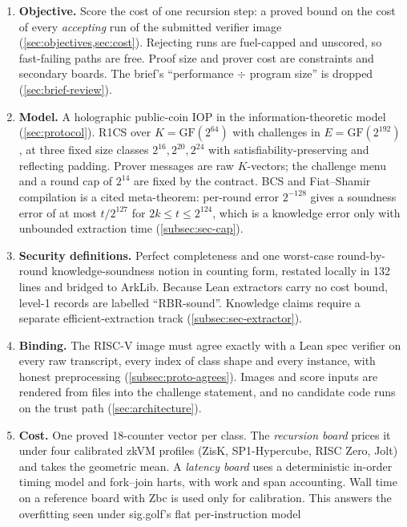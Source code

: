 \begin{takeaway}
\begin{enumerate}[nosep,leftmargin=*]
\item \textbf{Objective.} Score the cost of one recursion step: a proved bound on the cost of every
  \emph{accepting} run of the submitted verifier image (\cref{sec:objectives,sec:cost}). Rejecting
  runs are fuel-capped and unscored, so fast-failing paths are free. Proof size and prover cost are
  constraints and secondary boards. The brief's \enquote{performance $\div$ program size} is dropped
  (\cref{sec:brief-review}).
\item \textbf{Model.} A holographic public-coin IOP in the information-theoretic model
  (\cref{sec:protocol}). R1CS over $K=\mathrm{GF}(2^{64})$ with challenges in
  $E=\mathrm{GF}(2^{192})$, at three fixed size classes $2^{16},2^{20},2^{24}$ with
  satisfiability-preserving and reflecting padding. Prover messages are raw $K$-vectors; the
  challenge menu and a round cap of $2^{14}$ are fixed by the contract. BCS and Fiat--Shamir
  compilation is a cited meta-theorem: per-round error $2^{-128}$ gives a soundness error of at most
  $t/2^{127}$ for $2k\le t\le2^{124}$, which is a knowledge error only with unbounded extraction time
  (\cref{subsec:sec-cap}).
\item \textbf{Security definitions.} Perfect completeness and one worst-case round-by-round
  knowledge-soundness notion in counting form, restated locally in 132 lines and bridged to
  ArkLib. Because Lean extractors carry no cost bound, level-1 records are labelled
  \enquote{RBR-sound}. Knowledge claims require a separate efficient-extraction track
  (\cref{subsec:sec-extractor}).
\item \textbf{Binding.} The RISC-V image must agree exactly with a Lean spec verifier on every raw
  transcript, every index of class shape and every instance, with honest preprocessing
  (\cref{subsec:proto-agrees}). Images and score inputs are rendered from files into the challenge
  statement, and no candidate code runs on the trust path (\cref{sec:architecture}).
\item \textbf{Cost.} One proved 18-counter vector per class. The \emph{recursion board} prices it
  under four calibrated zkVM profiles (ZisK, SP1-Hypercube, RISC Zero, Jolt) and takes the
  geometric mean. A \emph{latency board} uses a deterministic in-order timing model and fork--join
  harts, with work and span accounting. Wall time on a reference board with Zbc is used only for
  calibration. This answers the overfitting seen under sig.golf's flat per-instruction model

\end{enumerate}
\end{takeaway}
